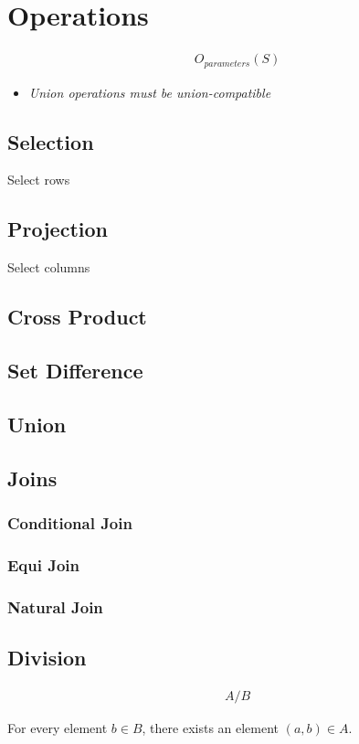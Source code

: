 \chapter{Operations}

\begin{align}
  O_{parameters} \left( S \right)
\end{align}

\begin{itemize}
  \item \emph{Union operations must be \gls{union-compatible}}
\end{itemize}

\section{Selection}

  Select rows

\section{Projection}

  Select columns

\section{Cross Product}
\section{Set Difference}
\section{Union}
\section{Joins}

  \subsection{Conditional Join}
  \subsection{Equi Join}
  \subsection{Natural Join}

\section{Division}

  \begin{align}
    A / B
  \end{align}

  For every element $ b \in B $, there exists an element
  $ \left( a, b \right) \in A $.
